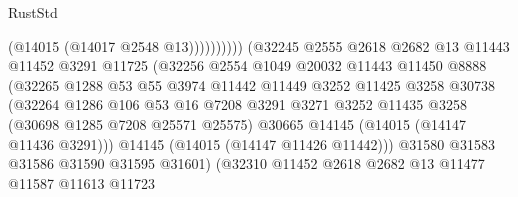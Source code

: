 \begin{lexlean}{RustStd}
\begin{coremodule}
                                              (@14015 (@14017 @2548 @13))))))))))
                              (@32245
                                @2555
                                @2618
                                @2682
                                @13
                                @11443
                                @11452
                                @3291
                                @11725
                                (@32256
                                  @2554
                                  @1049
                                  @20032
                                  @11443
                                  @11450
                                  @8888
                                  (@32265
                                    @1288
                                    @53
                                    @55
                                    @3974
                                    @11442
                                    @11449
                                    @3252
                                    @11425
                                    @3258
                                    @30738
                                    (@32264
                                      @1286
                                      @106
                                      @53
                                      @16
                                      @7208
                                      @3291
                                      @3271
                                      @3252
                                      @11435
                                      @3258
                                      (@30698 @1285 @7208 @25571 @25575)
                                      @30665
                                      @14145
                                      (@14015 (@14147 @11436 @3291)))
                                    @14145
                                    (@14015 (@14147 @11426 @11442)))
                                  @31580
                                  @31583
                                  @31586
                                  @31590
                                  @31595
                                  @31601)
                                (@32310
                                  @11452
                                  @2618
                                  @2682
                                  @13
                                  @11477
                                  @11587
                                  @11613
                                  @11723

\end{coremodule}
\end{lexlean}
